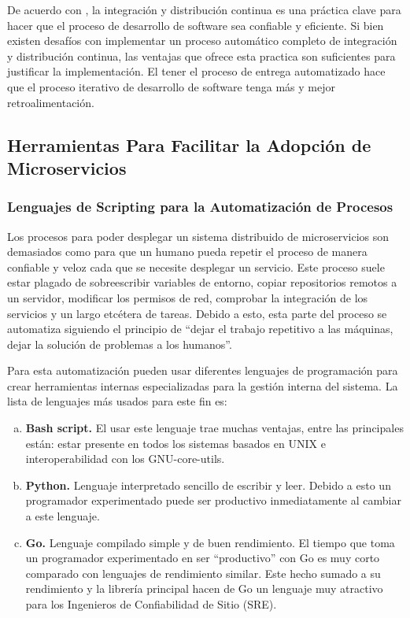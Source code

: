 De acuerdo con \cite{forsgren2019}, la integración y distribución continua es una práctica clave
para hacer que el proceso de desarrollo de software sea confiable y eficiente.
Si bien existen desafíos con implementar un proceso automático completo de integración y distribución
continua, las ventajas que ofrece esta practica son suficientes para justificar la implementación.
El tener el proceso de entrega automatizado hace que el proceso iterativo de desarrollo de software
tenga más y mejor retroalimentación.


\subsection{Herramientas Para Facilitar la Adopción de Microservicios}

\subsubsection{Lenguajes de Scripting para la Automatización de Procesos}

Los procesos para poder desplegar un sistema distribuido de microservicios son demasiados como para que 
un humano pueda repetir el proceso de manera confiable y veloz cada que se necesite desplegar un servicio.
Este proceso suele estar plagado de sobreescribir variables de entorno, copiar repositorios remotos
a un servidor, modificar los permisos de red, comprobar la integración de los servicios y un largo etcétera
de tareas.
Debido a esto, esta parte del proceso se automatiza siguiendo el principio de ``dejar el trabajo repetitivo
a las máquinas, dejar la solución de problemas a los humanos''.

Para esta automatización pueden usar diferentes lenguajes de programación para crear herramientas internas
especializadas para la gestión interna del sistema.
La lista de lenguajes más usados para este fin es:

\vspace{-1em}
\begin{enumerate}[a.]
  \item \textbf{Bash script.}
    El usar este lenguaje trae muchas ventajas, entre las principales están: estar presente en todos
    los sistemas basados en UNIX e interoperabilidad con los GNU-core-utils.
  \item \textbf{Python.}
    Lenguaje interpretado sencillo de escribir y leer.
    Debido a esto un programador experimentado puede ser productivo inmediatamente al cambiar a este lenguaje.
  \item \textbf{Go.}
    Lenguaje compilado simple y de buen rendimiento.
    El tiempo que toma un programador experimentado en ser ``productivo'' con Go es muy corto comparado con
    lenguajes de rendimiento similar.
    Este hecho sumado a su rendimiento y la librería principal hacen de Go un lenguaje muy atractivo
    para los Ingenieros de Confiabilidad de Sitio (SRE).
\end{enumerate}
\vspace{-1em}


